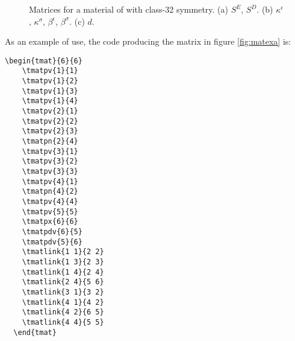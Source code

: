 \documentclass[12pt,a4paper]{article}
\begin{document}
\begin{figure}[h]
  \centering
  \hspace{2cm}
  \hspace{2cm}
  \caption{Matrices for a material of with class-32 symmetry. (a) $S^E$, $S^D$. (b) $\kappa^\epsilon$, $\kappa^\sigma$, $\beta^\epsilon$, $\beta^\sigma$. (c) $d$.}
\label{fig:matex}
\end{figure}

\newpage
As an example of use, the code producing the matrix in figure \ref{fig:matexa} 
is:
\begin{verbatim}
\begin{tmat}{6}{6}
    \tmatpv{1}{1}
    \tmatpv{1}{2}
    \tmatpv{1}{3}
    \tmatpv{1}{4}
    \tmatpv{2}{1}
    \tmatpv{2}{2}
    \tmatpv{2}{3}
    \tmatpn{2}{4}
    \tmatpv{3}{1}
    \tmatpv{3}{2}
    \tmatpv{3}{3}
    \tmatpv{4}{1}
    \tmatpn{4}{2}
    \tmatpv{4}{4}
    \tmatpv{5}{5}
    \tmatpx{6}{6}
    \tmatpdv{6}{5}
    \tmatpdv{5}{6}
    \tmatlink{1 1}{2 2}
    \tmatlink{1 3}{2 3}
    \tmatlink{1 4}{2 4}
    \tmatlink{2 4}{5 6}
    \tmatlink{3 1}{3 2}
    \tmatlink{4 1}{4 2}
    \tmatlink{4 2}{6 5}
    \tmatlink{4 4}{5 5}
  \end{tmat}
\end{verbatim}
\end{document}
